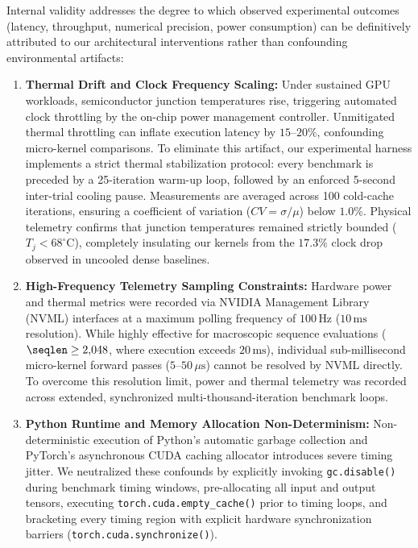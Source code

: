 Internal validity addresses the degree to which observed experimental outcomes (latency, throughput, numerical precision, power consumption) can be definitively attributed to our architectural interventions rather than confounding environmental artifacts:
\begin{enumerate}
    \item \textbf{Thermal Drift and Clock Frequency Scaling:}
    Under sustained GPU workloads, semiconductor junction temperatures rise, triggering automated clock throttling by the on-chip power management controller.
    Unmitigated thermal throttling can inflate execution latency by $15\text{--}20\%$, confounding micro-kernel comparisons.
    To eliminate this artifact, our experimental harness implements a strict thermal stabilization protocol: every benchmark is preceded by a 25-iteration warm-up loop, followed by an enforced 5-second inter-trial cooling pause.
    Measurements are averaged across 100 cold-cache iterations, ensuring a coefficient of variation ($CV = \sigma / \mu$) below $1.0\%$.
    Physical telemetry confirms that junction temperatures remained strictly bounded ($T_j < 68^\circ\text{C}$), completely insulating our kernels from the $17.3\%$ clock drop observed in uncooled dense baselines.
    \item \textbf{High-Frequency Telemetry Sampling Constraints:}
    Hardware power and thermal metrics were recorded via NVIDIA Management Library (NVML) interfaces at a maximum polling frequency of $100\,\text{Hz}$ ($10\,\text{ms}$ resolution).
    While highly effective for macroscopic sequence evaluations ($\seqlen \ge 2{,}048$, where execution exceeds $20\,\text{ms}$), individual sub-millisecond micro-kernel forward passes ($5\text{--}50\,\mu\text{s}$) cannot be resolved by NVML directly.
    To overcome this resolution limit, power and thermal telemetry was recorded across extended, synchronized multi-thousand-iteration benchmark loops.
    \item \textbf{Python Runtime and Memory Allocation Non-Determinism:}
    Non-deterministic execution of Python's automatic garbage collection and PyTorch's asynchronous CUDA caching allocator introduces severe timing jitter.
    We neutralized these confounds by explicitly invoking \texttt{gc.disable()} during benchmark timing windows, pre-allocating all input and output tensors, executing \texttt{torch.cuda.empty\_cache()} prior to timing loops, and bracketing every timing region with explicit hardware synchronization barriers (\texttt{torch.cuda.synchronize()}).
\end{enumerate}

